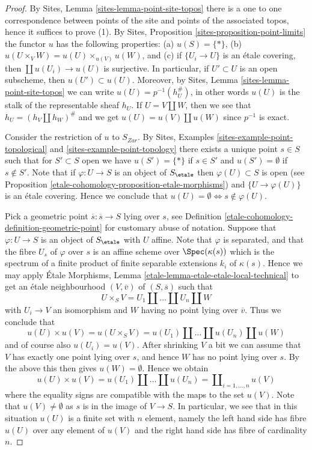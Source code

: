 \begin{proof}
By
Sites, Lemma \ref{sites-lemma-point-site-topos}
there is a one to one correspondence between points of the site and points
of the associated topos, hence it suffices to prove (1).
By
Sites, Proposition \ref{sites-proposition-point-limits}
the functor $u$ has the following properties:
(a) $u(S) = \{*\}$, (b) $u(U \times_V W) = u(U) \times_{u(V)} u(W)$, and
(c) if $\{U_i \to U\}$ is an \'etale covering, then
$\coprod u(U_i) \to u(U)$ is surjective.
In particular, if $U' \subset U$ is an open subscheme,
then $u(U') \subset u(U)$. Moreover, by
Sites, Lemma \ref{sites-lemma-point-site-topos}
we can write $u(U) = p^{-1}(h_U^\#)$, in other words $u(U)$ is the
stalk of the representable sheaf $h_U$. If
$U = V \amalg W$, then we see that $h_U = (h_V \amalg h_W)^\#$ and we get
$u(U) = u(V) \amalg u(W)$ since $p^{-1}$ is exact.

\medskip\noindent
Consider the restriction of $u$ to $S_{Zar}$. By
Sites, Examples \ref{sites-example-point-topological} and
\ref{sites-example-point-topology}
there exists a unique point $s \in S$ such that for $S' \subset S$ open we
have $u(S') = \{*\}$ if $s \in S'$ and $u(S') = \emptyset$ if $s \not \in S'$.
Note that if $\varphi : U \to S$ is an object of $S_\etale$ then
$\varphi(U) \subset S$ is open (see
Proposition \ref{etale-cohomology-proposition-etale-morphisms})
and $\{U \to \varphi(U)\}$ is an \'etale covering. Hence we conclude that
$u(U) = \emptyset \Leftrightarrow s \not \in \varphi(U)$.

\medskip\noindent
Pick a geometric point $\overline{s} : \overline{s} \to S$ lying over $s$, see
Definition \ref{etale-cohomology-definition-geometric-point}
for customary abuse of notation. Suppose that $\varphi : U \to S$ is an object
of $S_\etale$ with $U$ affine. Note that $\varphi$ is separated, and
that the fibre $U_s$ of $\varphi$ over $s$ is an affine scheme over
$\Spec(\kappa(s))$ which is the spectrum of a finite product of
finite separable extensions $k_i$ of $\kappa(s)$. Hence we may apply
\'Etale Morphisms, Lemma \ref{etale-lemma-etale-etale-local-technical}
to get an \'etale neighbourhood $(V, \overline{v})$ of $(S, \overline{s})$
such that
$$
U \times_S V = U_1 \amalg \ldots \amalg U_n \amalg W
$$
with $U_i \to V$ an isomorphism and $W$ having no point lying over
$\overline{v}$. Thus we conclude that
$$
u(U) \times u(V) =
u(U \times_S V) =
u(U_1) \amalg \ldots \amalg u(U_n) \amalg u(W)
$$
and of course also $u(U_i) = u(V)$. After shrinking $V$ a bit we can
assume that $V$ has exactly one point lying over $s$, and hence $W$ has no
point lying over $s$. By the above this then gives $u(W) = \emptyset$.
Hence we obtain
$$
u(U) \times u(V) =
u(U_1) \amalg \ldots \amalg u(U_n) =
\coprod\nolimits_{i = 1, \ldots, n} u(V)
$$
where the equality signs are compatible with the maps to the set $u(V)$.
Note that $u(V) \not = \emptyset$ as $s$ is in the image of $V \to S$.
In particular, we see that in this situation $u(U)$ is a finite
set with $n$ element, namely the left hand side has fibre $u(U)$ over
any element of $u(V)$ and the right hand side has fibre of cardinality $n$.


\end{proof}
